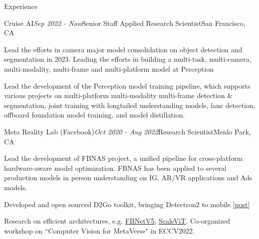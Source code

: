 \documentclass{resume} %
\begin{document}
\begin{rSection}{Experience}

\begin{rSubsection}{Cruise AI}{\em Sep 2022 - Now}{Senior Staff Applied Research Scientist}{San Francisco, CA}
\item Lead the efforts in camera major model consolidation on object detection and segmentation in 2023. Leading the efforts in building a multi-task, multi-camera, multi-modality, multi-frame and multi-platform model at Perception
\item Lead the development of the Perception model training pipeline, which supports various projects on multi-platform multi-modality multi-frame detection \& segmentation, joint training with longtailed understanding models, lane detection, offboard foundation model training, and model distillation.
\end{rSubsection}

\begin{rSubsection}{Meta Reality Lab (Facebook)}{\em Oct 2020 - Aug 2022}{Research Scientist}{Menlo Park, CA} %
\item Lead the development of FBNAS project, a unified pipeline for cross-platform hardware-aware model optimization. FBNAS has been applied to several production models in person understanding on IG, AR/VR applications and Ads models.
\item Developed and open sourced D2Go toolkit, bringing Detectron2 to mobile [\href{https://ai.facebook.com/blog/d2go-brings-detectron2-to-mobile/}{post}]
\item Research on efficient architectures, e.g. \href{https://scholar.google.com/citations?view_op=view_citation&hl=en&user=gCoWdkUAAAAJ&sortby=pubdate&citation_for_view=gCoWdkUAAAAJ:ML0RJ9NH7IQC}{FBNetV5}, \href{https://scholar.google.com/citations?view_op=view_citation&hl=en&user=gCoWdkUAAAAJ&sortby=pubdate&citation_for_view=gCoWdkUAAAAJ:p__nRnzSRKYC}{ScaleViT}. Co-organized workshop on ``Computer Vision for MetaVerse" in ECCV2022.
\end{rSubsection}


\end{rSection}
\end{document}
